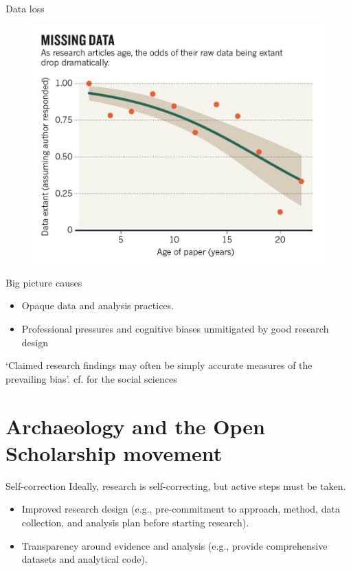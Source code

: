 \documentclass[aspectratio=169, 11pt]{beamer} %
\begin{document}
\begin{frame}{Data loss}
 \begin{figure}[H]
    \centering
        \includegraphics[height=.75\textheight]{figures/Missing-Data.png}
        \caption{\cite{Vines2014-zr}}
        \label{fig:vines2014}
 \end{figure}
\end{frame}

\begin{frame}{Big picture causes}
    \begin{itemize}[label=\textbullet]
        \item Opaque data and analysis practices. \cite{Marwick2017-bz}
        \item Professional pressures and cognitive biases unmitigated by good research design \cite{Muthukrishna2019-kt}
    \end{itemize}
    `Claimed research findings may often be simply accurate measures of the prevailing bias'. \cite{Alberts2015-nq} cf. \cite{Sahlins1999-is} for the social sciences \par
\end{frame}

\section{Archaeology and the Open Scholarship movement}

\begin{frame}{Self-correction}
Ideally, research is self-correcting, but active steps must be taken.
    \begin{itemize}[label=\textbullet]
        \item Improved research design (e.g., pre-commitment to approach, method, data collection, and analysis plan before starting research).
        \item Transparency around evidence and analysis (e.g., provide comprehensive datasets and analytical code).
    \end{itemize}
\end{frame}
\end{document}
